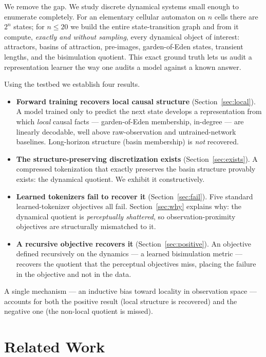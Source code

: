 \documentclass[11pt]{article}
\begin{document}
We remove the gap. We study discrete dynamical systems small enough to
enumerate completely. For an elementary cellular automaton on $n$ cells there
are $2^n$ states; for $n \le 20$ we build the entire state-transition graph
and from it compute, \emph{exactly and without sampling}, every dynamical
object of interest: attractors, basins of attraction, pre-images,
garden-of-Eden states, transient lengths, and the bisimulation quotient. This
exact ground truth lets us audit a representation learner the way one audits a
model against a known answer.

Using the testbed we establish four results.

\begin{itemize}
  \item \textbf{Forward training recovers local causal structure}
    (Section~\ref{sec:local}). A model trained only to predict the next state
    develops a representation from which \emph{local} causal facts ---
    garden-of-Eden membership, in-degree --- are linearly decodable, well
    above raw-observation and untrained-network baselines. Long-horizon
    structure (basin membership) is \emph{not} recovered.
  \item \textbf{The structure-preserving discretization exists}
    (Section~\ref{sec:exists}). A compressed tokenization that exactly
    preserves the basin structure provably exists: the dynamical quotient.
    We exhibit it constructively.
  \item \textbf{Learned tokenizers fail to recover it}
    (Section~\ref{sec:fail}). Five standard learned-tokenizer objectives all
    fail. Section~\ref{sec:why} explains why: the dynamical quotient is
    \emph{perceptually shattered}, so observation-proximity objectives are
    structurally mismatched to it.
  \item \textbf{A recursive objective recovers it}
    (Section~\ref{sec:positive}). An objective defined recursively on the
    dynamics --- a learned bisimulation metric --- recovers the quotient that
    the perceptual objectives miss, placing the failure in the objective and
    not in the data.
\end{itemize}

A single mechanism --- an inductive bias toward locality in
observation space --- accounts for both the positive result (local structure
is recovered) and the negative one (the non-local quotient is missed).

\section{Related Work}
\label{sec:related}
\end{document}
